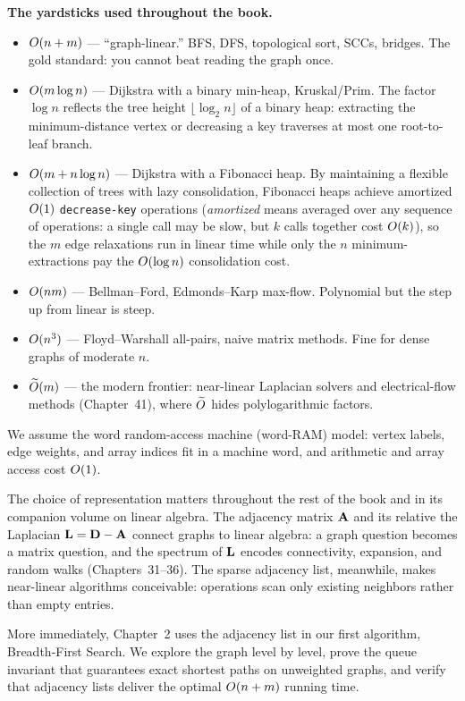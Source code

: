 \begin{complexitybox}
\textbf{The yardsticks used throughout the book.}
\begin{itemize}
  \item $O(n+m)$ --- ``graph-linear.'' BFS, DFS, topological sort, SCCs,
        bridges. The gold standard: you cannot beat reading the graph once.
  \item $O(m\log n)$ --- Dijkstra with a binary min-heap, Kruskal/Prim. The
        factor $\log n$ reflects the tree height $\lfloor \log_2 n \rfloor$ of a
        binary heap: extracting the minimum-distance vertex or decreasing a key
        traverses at most one root-to-leaf branch.
  \item $O(m + n\log n)$ --- Dijkstra with a Fibonacci heap. By maintaining a
        flexible collection of trees with lazy consolidation, Fibonacci heaps achieve
        amortized $O(1)$ \texttt{decrease-key} operations (\emph{amortized} means
        averaged over any sequence of operations: a single call may be slow, but $k$
        calls together cost $O(k)$), so the $m$ edge
        relaxations run in linear time while only the $n$ minimum-extractions pay
        the $O(\log n)$ consolidation cost.
  \item $O(nm)$ --- Bellman--Ford, Edmonds--Karp max-flow. Polynomial but the
        step up from linear is steep.
  \item $O(n^3)$ --- Floyd--Warshall all-pairs, naive matrix methods. Fine for
        dense graphs of moderate $n$.
  \item $\widetilde{O}(m)$ --- the modern frontier: near-linear Laplacian
        solvers and electrical-flow methods (Chapter~41), where $\widetilde{O}$
        hides polylogarithmic factors.
\end{itemize}
We assume the word random-access machine (word-RAM) model: vertex labels, edge
weights, and array indices fit in a machine word, and arithmetic and array
access cost $O(1)$.
\end{complexitybox}

\begin{connectionbox}
The choice of representation matters throughout the rest of the book and in its
companion volume on linear algebra. The adjacency matrix $\mathbf{A}$ and its
relative the Laplacian $\mathbf{L} = \mathbf{D} - \mathbf{A}$ connect graphs to linear algebra:
a graph question becomes a matrix question, and the spectrum of $\mathbf{L}$ encodes
connectivity, expansion, and random walks (Chapters~31--36). The sparse
adjacency list, meanwhile, makes near-linear algorithms conceivable: operations
scan only existing neighbors rather than empty entries.

More immediately, Chapter~2 uses the adjacency list in our first algorithm,
Breadth-First Search. We explore the graph level by level, prove the
queue invariant that guarantees exact shortest paths on unweighted graphs, and
verify that adjacency lists deliver the optimal $O(n+m)$ running time.
\end{connectionbox}

